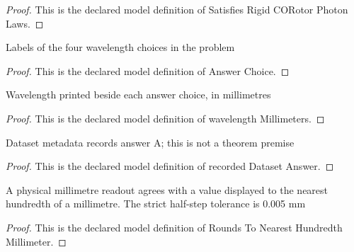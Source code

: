 \begin{proof}
  This is the declared model definition of Satisfies Rigid CORotor Photon Laws.
\end{proof}
\begin{definition}
  \label{def:physics:phyx-mini-0628:phyxminiproblems-problemphyxmini0628-answerchoice}
  Labels of the four wavelength choices in the problem
\end{definition}
\begin{proof}
  This is the declared model definition of Answer Choice.
\end{proof}
\begin{definition}
  \label{def:physics:phyx-mini-0628:phyxminiproblems-problemphyxmini0628-answerchoice-wavelengthmillimeters}
  Wavelength printed beside each answer choice, in millimetres
\end{definition}
\begin{proof}
  This is the declared model definition of wavelength Millimeters.
\end{proof}
\begin{definition}
  \label{def:physics:phyx-mini-0628:phyxminiproblems-problemphyxmini0628-recordeddatasetanswer}
  Dataset metadata records answer A; this is not a theorem premise
\end{definition}
\begin{proof}
  This is the declared model definition of recorded Dataset Answer.
\end{proof}
\begin{definition}
  \label{def:physics:phyx-mini-0628:phyxminiproblems-problemphyxmini0628-roundstonearesthundredthmillimeter}
  A physical millimetre readout agrees with a value displayed to the nearest hundredth of a millimetre. The strict half-step tolerance is 0.005 mm
\end{definition}
\begin{proof}
  This is the declared model definition of Rounds To Nearest Hundredth Millimeter.
\end{proof}
